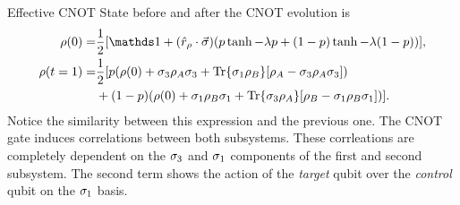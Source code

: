 \begin{frame}{Effective CNOT}
    State before and after the CNOT evolution is
    \begin{align*}
        \rho(0)=&\frac{1}{2}[\Id+(\hat{r}_{\rho}\cdot\vec{\sigma})(p\tanh{-\lambda p}+(1-p)\tanh{-\lambda (1-p)})],\\
        \rho(t=1)=&\frac{1}{2}[p(\rho(0)+\sigma_{3}\rho_{A}\sigma_{3}+\Tr{\sigma_{1}\rho_{B}}[\rho_{A}-\sigma_{3}\rho_{A}\sigma_{3}])\\
    &+(1-p)(\rho(0)+\sigma_{1}\rho_{B}\sigma_{1}+\Tr{\sigma_{3}\rho_{A}}[\rho_{B}-\sigma_{1}\rho_{B}\sigma_{1}])].
        \end{align*}
    Notice the similarity between this expression and the previous one. The CNOT gate induces correlations between both subsystems. These corrleations are completely dependent on the $\sigma_{3}$ and $\sigma_{1}$ components of the first and second subsystem.
    The second term shows the action of the \textit{target} qubit over the \textit{control} qubit on the $\sigma_{1}$ basis.
\end{frame}


